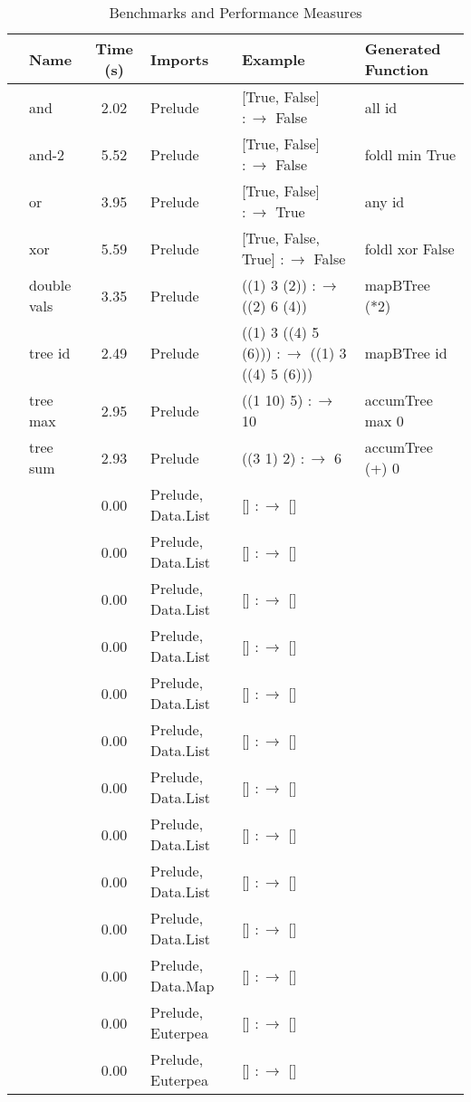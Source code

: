 \begin{table*}[t]
  \centering
  \begin{tabular}{|c|l|c|l|l|l|}
    \hline
    & Name & Time (s) & Imports & Example & Generated Function \\
    \hline
    \parbox[t]{2mm}{}
    & and & 2.02 & Prelude & [True, False] $:\to$ False & all id \\
    & and-2 & 5.52 & Prelude & [True, False] $:\to$ False & foldl min True \\
    & or  & 3.95 & Prelude & [True, False] $:\to$ True & any id \\
    & xor & 5.59 & Prelude & [True, False, True] $:\to$ False & foldl xor False \\
    \hline
    
    \parbox[t]{2mm}{}
    & double vals & 3.35 & Prelude & ((1) 3 (2)) $:\to$ ((2) 6 (4)) & mapBTree (*2) \\
    & tree id & 2.49 & Prelude & ((1) 3 ((4) 5 (6))) $:\to$ ((1) 3 ((4) 5 (6))) & mapBTree id \\
    & tree max & 2.95 & Prelude & ((1 10) 5) $:\to$ 10 & accumTree max 0 \\
    & tree sum & 2.93 & Prelude & ((3 1) 2) $:\to$ 6 & accumTree (+) 0 \\
    \hline
    
    \parbox[t]{2mm}{}
    &  & 0.00 & Prelude, Data.List & [] $:\to$ [] & \\
    &  & 0.00 & Prelude, Data.List & [] $:\to$ [] & \\
    &  & 0.00 & Prelude, Data.List & [] $:\to$ [] & \\
    &  & 0.00 & Prelude, Data.List & [] $:\to$ [] & \\
    &  & 0.00 & Prelude, Data.List & [] $:\to$ [] & \\
    &  & 0.00 & Prelude, Data.List & [] $:\to$ [] & \\
    &  & 0.00 & Prelude, Data.List & [] $:\to$ [] & \\
    &  & 0.00 & Prelude, Data.List & [] $:\to$ [] & \\
    &  & 0.00 & Prelude, Data.List & [] $:\to$ [] & \\
    &  & 0.00 & Prelude, Data.List & [] $:\to$ [] & \\
    \hline
    
    \parbox[t]{2mm}{}
    &  & 0.00 & Prelude, Data.Map & [] $:\to$ [] & \\
    &  & 0.00 & Prelude, Euterpea & [] $:\to$ [] & \\
    &  & 0.00 & Prelude, Euterpea & [] $:\to$ [] & \\
    \hline
  \end{tabular}
  \caption{Benchmarks and Performance Measures}
  \label{tab:benchmarks}
\end{table*}

